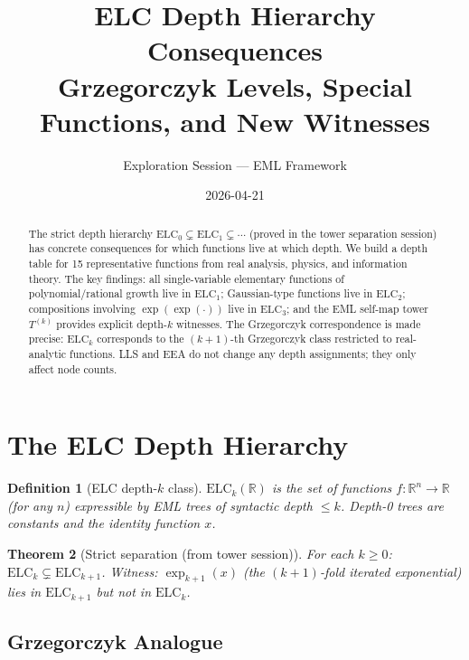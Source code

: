 \documentclass[11pt]{article}
\title{ELC Depth Hierarchy Consequences\\
{\large Grzegorczyk Levels, Special Functions, and New Witnesses}}
\author{Exploration Session --- EML Framework}
\date{2026-04-21}
\newtheorem{theorem}{Theorem}
\newtheorem{definition}[theorem]{Definition}
\begin{document}
\maketitle

\begin{abstract}
The strict depth hierarchy $\mathrm{ELC}_0 \subsetneq \mathrm{ELC}_1 \subsetneq \cdots$
(proved in the tower separation session) has concrete consequences for
which functions live at which depth. We build a depth table for 15
representative functions from real analysis, physics, and information theory.
The key findings: all single-variable elementary functions of polynomial/rational
growth live in $\mathrm{ELC}_1$; Gaussian-type functions live in $\mathrm{ELC}_2$;
compositions involving $\exp(\exp(\cdot))$ live in $\mathrm{ELC}_3$;
and the EML self-map tower $T^{(k)}$ provides explicit depth-$k$ witnesses.
The Grzegorczyk correspondence is made precise: $\mathrm{ELC}_k$ corresponds
to the $(k{+}1)$-th Grzegorczyk class restricted to real-analytic functions.
LLS and EEA do not change any depth assignments; they only affect node counts.
\end{abstract}

\tableofcontents
\bigskip

\section{The ELC Depth Hierarchy}
\label{sec:hierarchy}

\begin{definition}[ELC depth-$k$ class]
$\mathrm{ELC}_k(\mathbb{R})$ is the set of functions $f : \mathbb{R}^n \to \mathbb{R}$
(for any $n$) expressible by EML trees of syntactic depth $\leq k$.
Depth-0 trees are constants and the identity function $x$.
\end{definition}

\begin{theorem}[Strict separation (from tower session)]
For each $k \geq 0$:
$\mathrm{ELC}_k \subsetneq \mathrm{ELC}_{k+1}$.
Witness: $\exp_{k+1}(x)$ (the $(k+1)$-fold iterated exponential)
lies in $\mathrm{ELC}_{k+1}$ but not in $\mathrm{ELC}_k$.
\end{theorem}

\subsection{Grzegorczyk Analogue}
\end{document}
